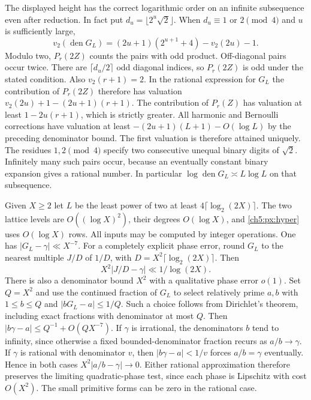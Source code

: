 \documentclass[11pt,a4paper,oneside,openany]{report}
\theoremstyle{remark}\newtheorem{remark}[theorem]{Remark}
\numberwithin{equation}{section}
\begin{document}
The displayed height has the correct logarithmic order on an infinite
subsequence even after reduction. In fact put
$d_u=\lfloor2^u\sqrt2\rfloor$. When $d_u\equiv1$ or $2\pmod4$
and $u$ is sufficiently large,
\[
 v_2(\operatorname{den}G_L)=(2u+1)(2^{u+1}+4)-v_2(2u)-1 .
\]
Modulo two, $P_r(2Z)$ counts the pairs with odd product.
Off-diagonal pairs occur twice. There are
$\lceil d_u/2\rceil$ odd diagonal indices, so $P_r(2Z)$ is odd
under the stated condition. Also $v_2(r+1)=2$. In the rational
expression for $G_L$ the contribution of $P_r(2Z)$ therefore has
valuation $v_2(2u)+1-(2u+1)(r+1)$. The contribution of $P_r(Z)$
has valuation at least $1-2u(r+1)$, which is strictly greater.
All harmonic and Bernoulli corrections have valuation at least
$-(2u+1)(L+1)-O(\log L)$ by the preceding denominator bound.
The first valuation is therefore attained uniquely. The residues
$1,2\pmod4$ specify two consecutive unequal binary digits of
$\sqrt2$. Infinitely many such pairs occur, because an eventually
constant binary expansion gives a rational number. In particular
$\log\operatorname{den}G_L\asymp L\log L$ on that subsequence.

Given $X\ge2$ let $L$ be the least power of two at least
$4\lceil\log_2(2X)\rceil$. The two lattice levels are
$O((\log X)^2)$, their degrees $O(\log X)$, and \eqref{ch5:px:hyper}
uses $O(\log X)$ rows. All inputs may be computed by integer
operations. One has $|G_L-\gamma|\ll X^{-7}$.
For a completely explicit phase error, round $G_L$ to the
nearest multiple $J/D$ of $1/D$, with
$D=X^2\lceil\log_2(2X)\rceil$. Then
\[
 X^2|J/D-\gamma|\ll 1/\log(2X).
\]
There is also a denominator bound $X^2$ with a qualitative phase
error $o(1)$. Set $Q=X^2$ and use the continued fraction of $G_L$
to select relatively prime $a,b$ with $1\le b\le Q$ and
$|bG_L-a|\le1/Q$. Such a choice follows from Dirichlet's theorem,
including exact fractions with denominator at most $Q$. Then
$|b\gamma-a|\le Q^{-1}+O(QX^{-7})$. If $\gamma$ is irrational,
the denominators $b$ tend to infinity, since otherwise a fixed
bounded-denominator fraction recurs as $a/b\to\gamma$.
If $\gamma$ is rational with denominator $v$, then
$|b\gamma-a|<1/v$ forces $a/b=\gamma$ eventually. Hence in
both cases $X^2|a/b-\gamma|\to0$. Either rational approximation
therefore preserves the limiting quadratic-phase test, since
each phase is Lipschitz with cost $O(X^2)$.
The small primitive forms can be zero in the rational case.
\end{document}
